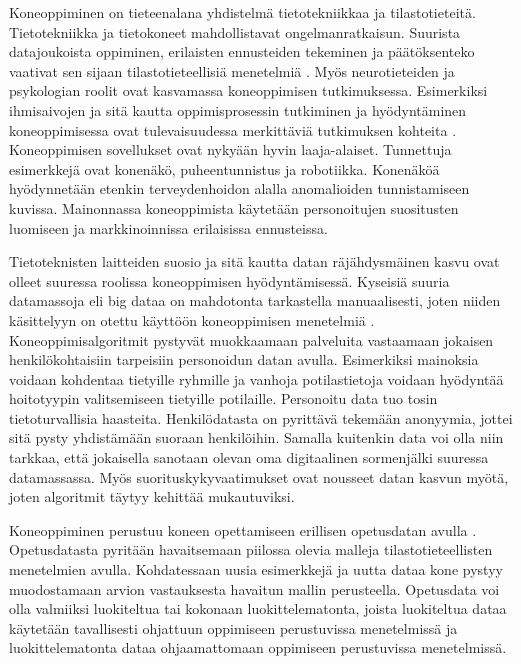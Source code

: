 \documentclass[utf8]{gradu3}
\begin{document}
Koneoppiminen on tieteenalana yhdistelmä tietotekniikkaa ja tilastotieteitä. Tietotekniikka ja tietokoneet mahdollistavat ongelmanratkaisun. Suurista datajoukoista oppiminen, erilaisten ennusteiden tekeminen ja päätöksenteko vaativat sen sijaan tilastotieteellisiä menetelmiä \parencite{das2017survey,jordan2015machine}. Myös neurotieteiden ja psykologian roolit ovat kasvamassa koneoppimisen tutkimuksessa. Esimerkiksi ihmisaivojen ja sitä kautta oppimisprosessin tutkiminen ja hyödyntäminen koneoppimisessa ovat tulevaisuudessa merkittäviä tutkimuksen kohteita \parencite{das2017survey}. Koneoppimisen sovellukset ovat nykyään hyvin laaja-alaiset. Tunnettuja esimerkkejä ovat konenäkö, puheentunnistus ja robotiikka. Konenäköä hyödynnetään etenkin terveydenhoidon alalla anomalioiden tunnistamiseen kuvissa. Mainonnassa koneoppimista käytetään personoitujen suositusten luomiseen ja markkinoinnissa erilaisissa ennusteissa.

Tietoteknisten laitteiden suosio ja sitä kautta datan räjähdysmäinen kasvu ovat olleet suuressa roolissa koneoppimisen hyödyntämisessä. Kyseisiä suuria datamassoja eli big dataa on mahdotonta tarkastella manuaalisesti, joten niiden käsittelyyn on otettu käyttöön koneoppimisen menetelmiä \parencite{jordan2015machine}. Koneoppimisalgoritmit pystyvät muokkaamaan palveluita vastaamaan jokaisen henkilökohtaisiin tarpeisiin personoidun datan avulla. Esimerkiksi mainoksia voidaan kohdentaa tietyille ryhmille ja vanhoja potilastietoja voidaan hyödyntää hoitotyypin valitsemiseen tietyille potilaille. Personoitu data tuo tosin tietoturvallisia haasteita. Henkilödatasta on pyrittävä tekemään anonyymia, jottei sitä pysty yhdistämään suoraan henkilöihin. Samalla kuitenkin data voi olla niin tarkkaa, että jokaisella sanotaan olevan oma digitaalinen sormenjälki suuressa datamassassa. Myös suorituskykyvaatimukset ovat nousseet datan kasvun myötä, joten algoritmit täytyy kehittää mukautuviksi.

Koneoppiminen perustuu koneen opettamiseen erillisen opetusdatan avulla \parencite{das2017survey,jordan2015machine}. Opetusdatasta pyritään havaitsemaan piilossa olevia malleja tilastotieteellisten menetelmien avulla. Kohdatessaan uusia esimerkkejä ja uutta dataa kone pystyy muodostamaan arvion vastauksesta havaitun mallin perusteella. Opetusdata voi olla valmiiksi luokiteltua tai kokonaan luokittelematonta, joista luokiteltua dataa käytetään tavallisesti ohjattuun oppimiseen perustuvissa menetelmissä ja luokittelematonta dataa ohjaamattomaan oppimiseen perustuvissa menetelmissä.
\end{document}
